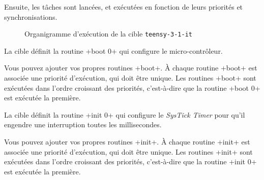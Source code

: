 Ensuite, les tâches sont lancées, et exécutées en fonction de leurs priorités et synchronisations.


\begin{figure}[t]
  \centering
  \small
  \caption{Organigramme d'exécution de la cible \texttt{teensy-3-1-it}}
  \ligne
\end{figure}











La cible définit la routine \plm+boot 0+ qui configure le micro-contrôleur.

Vous pouvez ajouter vos propres routines \plm+boot+. À chaque routine \plm+boot+ est associée une priorité d'exécution, qui doit être unique. Les routines \plm+boot+ sont exécutées dans l'ordre croissant des priorités, c'est-à-dire que la routine \plm+boot 0+ est exécutée la première.






La cible définit la routine \plm+init 0+ qui configure le \emph{SysTick Timer} pour qu'il engendre une interruption toutes les millisecondes.

Vous pouvez ajouter vos propres routines \plm+init+. À chaque routine \plm+init+ est associée une priorité d'exécution, qui doit être unique. Les routines \plm+init+ sont exécutées dans l'ordre croissant des priorités, c'est-à-dire que la routine \plm+init 0+ est exécutée la première.












